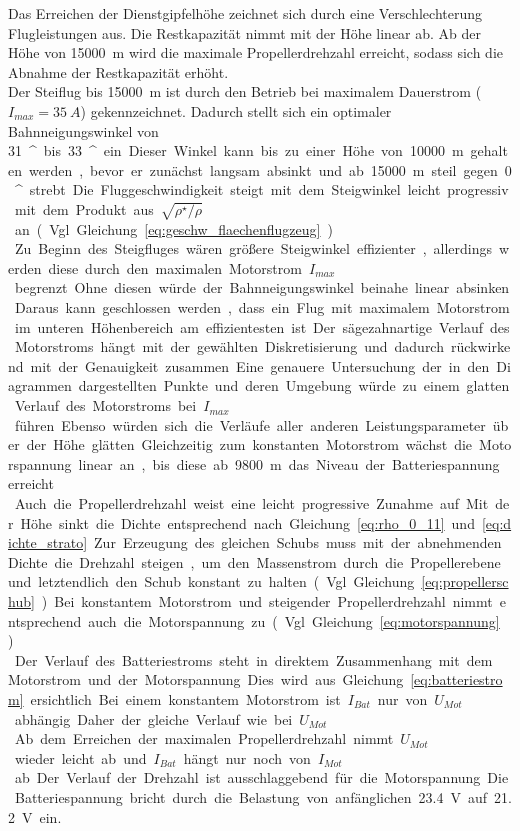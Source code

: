 Das Erreichen der Dienstgipfelhöhe zeichnet sich durch eine Verschlechterung Flugleistungen aus. Die Restkapazität nimmt mit der Höhe linear ab. Ab der Höhe von \SI{15000}{m} wird die maximale Propellerdrehzahl erreicht, sodass sich die Abnahme der Restkapazität erhöht. \\
Der Steiflug bis \SI{15000}{m} ist durch den Betrieb bei maximalem Dauerstrom (\ensuremath{I_{max} = \SI{35}{A}}) gekennzeichnet. Dadurch stellt sich ein optimaler Bahnneigungswinkel von \SI{31}{^\circ} bis \SI{33}{^\circ} ein. Dieser Winkel kann bis zu einer Höhe von \SI{10000}{m} gehalten werden, bevor er zunächst langsam absinkt und ab \SI{15000}{m} steil gegen \SI{0}{^\circ} strebt. Die Fluggeschwindigkeit steigt mit dem Steigwinkel leicht progressiv mit dem Produkt aus \ensuremath{\sqrt{\rho^\star/\rho}} an (Vgl. Gleichung \ref{eq:geschw_flaechenflugzeug}). \\
Zu Beginn des Steigfluges wären größere Steigwinkel effizienter, allerdings werden diese durch den maximalen Motorstrom \ensuremath{I_{max}} begrenzt. Ohne diesen würde der Bahnneigungswinkel beinahe linear absinken. Daraus kann geschlossen werden, dass ein Flug mit maximalem Motorstrom im unteren Höhenbereich am effizientesten ist. Der sägezahnartige Verlauf des Motorstroms hängt mit der gewählten Diskretisierung und dadurch rückwirkend mit der Genauigkeit zusammen. Eine genauere Untersuchung der in den Diagrammen dargestellten Punkte und deren Umgebung würde zu einem glatten Verlauf des Motorstroms bei \ensuremath{I_{max}} führen. Ebenso würden sich die Verläufe aller anderen Leistungsparameter über der Höhe glätten. Gleichzeitig zum konstanten Motorstrom wächst die Motorspannung linear an, bis diese ab \SI{9800}{m} das Niveau der Batteriespannung erreicht. \\
Auch die Propellerdrehzahl weist eine leicht progressive Zunahme auf. Mit der Höhe sinkt die Dichte entsprechend nach Gleichung \ref{eq:rho_0_11} und \ref{eq:dichte_strato}. Zur Erzeugung des gleichen Schubs muss mit der abnehmenden Dichte die Drehzahl steigen, um den Massenstrom durch die Propellerebene und letztendlich den Schub konstant zu halten (Vgl. Gleichung \ref{eq:propellerschub}). Bei konstantem Motorstrom und steigender Propellerdrehzahl nimmt entsprechend auch die Motorspannung zu (Vgl. Gleichung \ref{eq:motorspannung}). \\
Der Verlauf des Batteriestroms steht in direktem Zusammenhang mit dem Motorstrom und der Motorspannung. Dies wird aus Gleichung \ref{eq:batteriestrom} ersichtlich. Bei einem konstantem Motorstrom ist  \ensuremath{I_{Bat}} nur von \ensuremath{U_{Mot}} abhängig. Daher der gleiche Verlauf wie bei \ensuremath{U_{Mot}}. Ab dem Erreichen der maximalen Propellerdrehzahl nimmt \ensuremath{U_{Mot}} wieder leicht ab und \ensuremath{I_{Bat}} hängt nur noch von \ensuremath{I_{Mot}} ab. Der Verlauf der Drehzahl ist ausschlaggebend für die Motorspannung. Die Batteriespannung bricht durch die Belastung von anfänglichen \SI{23,4}{V} auf \SI{21,2}{V} ein. 
